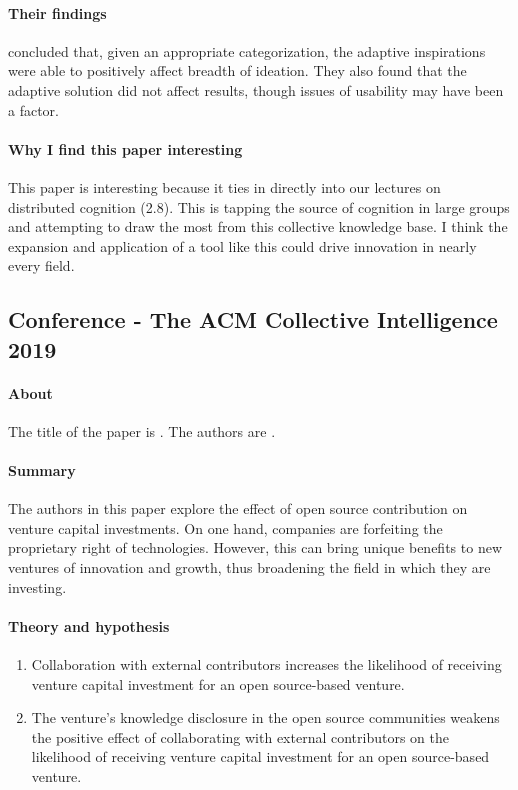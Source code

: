 \paragraph{Their findings} concluded that, given an appropriate categorization, the adaptive inspirations were able to positively affect breadth of ideation. They also found that the adaptive solution did not affect results, though issues of usability may have been a factor.

\paragraph{Why I find this paper interesting}
This paper is interesting because it ties in directly into our lectures on distributed cognition (2.8). This is tapping the source of cognition in large groups and attempting to draw the most from this collective knowledge base. I think the expansion and application of a tool like this could drive innovation in nearly every field.

\subsection{Conference - The ACM Collective Intelligence 2019}

\paragraph{About}
The title of the paper is . The authors are .

\paragraph{Summary}
The authors in this paper explore the effect of open source contribution on venture capital investments. On one hand, companies are forfeiting the proprietary right of technologies. However, this can bring unique benefits to new ventures of innovation and growth, thus broadening the field in which they are investing.

\paragraph{Theory and hypothesis}

\begin{enumerate}
\item
  Collaboration with external contributors increases the likelihood of receiving venture capital investment for an open source-based venture.
\item
   The venture’s knowledge disclosure in the open source communities weakens the positive effect of collaborating with external contributors on the likelihood of receiving venture capital investment for an open source-based venture.
\end{enumerate}

